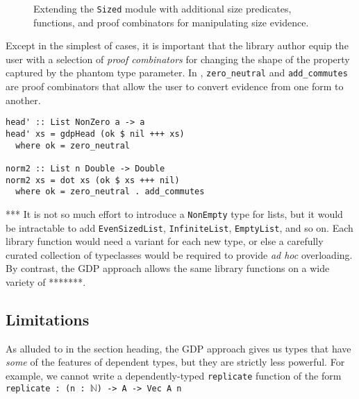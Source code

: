 \documentclass[format=sigplan, review=false, screen=true]{acmart}
\begin{document}
\begin{figure}
  \inputminted{haskell}{more_lists.hs}
  \caption{Extending the \texttt{Sized} module with additional size predicates,
    functions, and proof combinators for manipulating size evidence.\label{size-evidence}}
  \end{figure}

Except in the simplest of cases, it is important that the library author equip the
user with a selection of \emph{proof combinators} for changing the shape of the
property captured by the phantom type parameter. In , \texttt{zero\_neutral}
and \texttt{add\_commutes} are proof combinators that allow the user to convert
evidence from one form to another.

\begin{verbatim}
head' :: List NonZero a -> a
head' xs = gdpHead (ok $ nil +++ xs)
  where ok = zero_neutral

norm2 :: List n Double -> Double
norm2 xs = dot xs (ok $ xs +++ nil)
  where ok = zero_neutral . add_commutes
\end{verbatim}

*** It is not so much effort to introduce a \texttt{NonEmpty} type for lists, but it
would be intractable to add \texttt{EvenSizedList}, \texttt{InfiniteList},
\texttt{EmptyList}, and so on. Each library function would need a variant
for each new type, or else a carefully curated collection of typeclasses would
be required to provide \emph{ad hoc} overloading. By contrast, the GDP approach
allows the same library functions on a wide variety of *******.





   
\subsection{Limitations}
As alluded to in the section heading, the GDP approach gives us
types that have \emph{some} of the features of dependent types, but
they are strictly less powerful. For example, we cannot
write a dependently-typed \texttt{replicate} function of the form
\texttt{replicate : (n : $\mathbb{N}$) -> A -> Vec A n}
\end{document}
